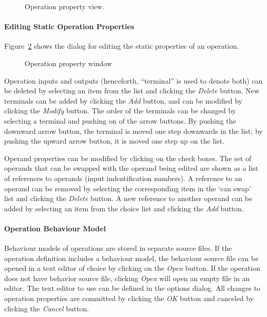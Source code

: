 \documentclass[twoside]{tceusermanual}
\begin{document}
\begin{figure}[tb]
\centerline{}
\caption{Operation property view.}
\label{fig:osed_operation_property_view}
\end{figure}

\paragraph{Editing Static Operation Properties}

Figure~\ref{fig:osed_operation_window} shows the dialog for editing the
static properties of an operation. 
 
\begin{figure}[tb]
\centerline{}
\caption{Operation property window}
\label{fig:osed_operation_window}
\end{figure}

Operation inputs and outputs (henceforth, ``terminal'' is used to denote both)
can be deleted by selecting an item from the list and clicking the \emph{Delete}
button. New terminals can be added
by clicking the \emph{Add} button, and can be modified by clicking the \emph{Modify}
button. The order of the terminals can be changed by selecting a terminal
and pushing on of the arrow buttons. By pushing the downward arrow button, the
terminal is moved one step downwards in the list; by pushing the upward arrow
button, it is moved one step up on the list.

Operand properties can be modified by clicking on the check boxes. The set
of operands that can be swapped with the operand being edited are shown as a
list of references to operands (input indentification numbers).  A reference
to an operand can be removed by selecting the corresponding item in the `can
swap' list and clicking the \emph{Delete} button.  A new reference to another
operand can be added by selecting an item from the choice list and clicking
the \emph{Add} button.

\paragraph{Operation Behaviour Model}

Behaviour models of operations are stored in separate source files.  If the
operation definition includes a behaviour model, the behaviour source file
can be opened in a text editor of choice by clicking on the \emph{Open}
button. If the operation does not have behavior source file, clicking
\emph{Open} will open an empty file in an editor. The text editor to use can
be defined in the options dialog. All changes to operation properties are 
committed by clicking the \emph{OK} button and canceled by clicking the \emph{Cancel} 
button.
\end{document}
